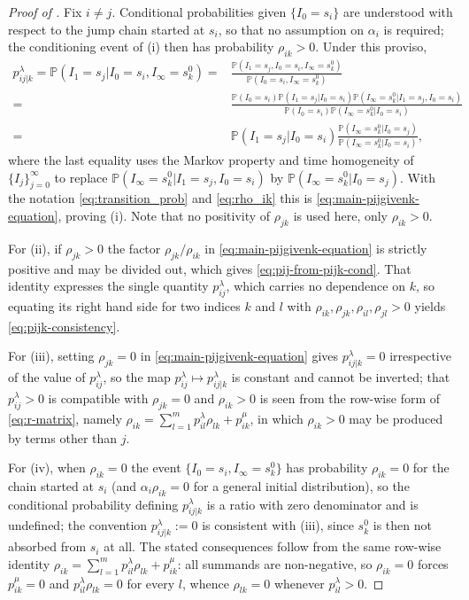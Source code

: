 \documentclass{article}
\begin{document}
\begin{proof}[Proof of ]
Fix $i \neq j$. Conditional probabilities given $\{I_0 = s_i\}$ are understood with respect to the
jump chain started at $s_i$, so that no assumption on $\alpha_i$ is required; the conditioning event
of \textup{(i)} then has probability $\rho_{ik} > 0$. Under this proviso,
\begin{align*}
p^\lambda_{ij|k}=\mathbb{P}(I_{1}=s_j\vert I_0=s_i, I_{\infty}=s_k^0) =&\frac{\mathbb{P}(I_{1}=s_j, I_0=s_i, I_{\infty}=s^0_k)}{\mathbb{P}(I_0=s_i, I_{\infty}=s_k^0)}\\
=&\frac{\mathbb{P}(I_0=s_i)\mathbb{P}(I_{1}=s_j\vert I_0=s_i)\mathbb{P}(I_{\infty}=s_k^0\vert I_{1}=s_j,I_0=s_i)}{\mathbb{P}(I_0=s_i)\mathbb{P}(I_{\infty}=s^0_k\vert I_0=s_i)}\\
=& \mathbb{P}(I_{1}=s_j\vert I_0=s_i) \frac{\mathbb{P}(I_{\infty}=s^0_k\vert I_{0}=s_j)}{\mathbb{P}(I_{\infty}=s^0_k\vert I_0=s_i)},
\end{align*}
where the last equality uses the Markov property and time homogeneity of $\{I_j\}_{j=0}^\infty$ to
replace $\mathbb{P}(I_{\infty}=s_k^0\vert I_{1}=s_j,I_0=s_i)$ by $\mathbb{P}(I_{\infty}=s_k^0\vert
I_{0}=s_j)$. With the notation \eqref{eq:transition_prob} and \eqref{eq:rho_ik} this is
\eqref{eq:main-pijgivenk-equation}, proving \textup{(i)}. Note that no positivity of $\rho_{jk}$ is
used here, only $\rho_{ik}>0$.

For \textup{(ii)}, if $\rho_{jk}>0$ the factor $\rho_{jk}/\rho_{ik}$ in
\eqref{eq:main-pijgivenk-equation} is strictly positive and may be divided out, which gives
\eqref{eq:pij-from-pijk-cond}. That identity expresses the single quantity $p^\lambda_{ij}$, which
carries no dependence on $k$, so equating its right hand side for two indices $k$ and $l$ with
$\rho_{ik},\rho_{jk},\rho_{il},\rho_{jl}>0$ yields \eqref{eq:pijk-consistency}.

For \textup{(iii)}, setting $\rho_{jk}=0$ in \eqref{eq:main-pijgivenk-equation} gives
$p^\lambda_{ij|k}=0$ irrespective of the value of $p^\lambda_{ij}$, so the map
$p^\lambda_{ij} \mapsto p^\lambda_{ij|k}$ is constant and cannot be inverted; that $p^\lambda_{ij}>0$
is compatible with $\rho_{jk}=0$ and $\rho_{ik}>0$ is seen from the row-wise form of
\eqref{eq:r-matrix}, namely $\rho_{ik} = \sum_{l=1}^m p^\lambda_{il}\rho_{lk} + p^\mu_{ik}$, in which
$\rho_{ik}>0$ may be produced by terms other than $j$.

For \textup{(iv)}, when $\rho_{ik}=0$ the event $\{I_0=s_i, I_\infty=s^0_k\}$ has probability
$\rho_{ik}=0$ for the chain started at $s_i$ (and $\alpha_i\rho_{ik}=0$ for a general initial
distribution), so the conditional probability defining $p^\lambda_{ij|k}$ is a ratio with zero
denominator and is undefined; the convention $p^\lambda_{ij|k}:=0$ is consistent with \textup{(iii)}, since $s^0_k$ is
then not absorbed from $s_i$ at all. The stated consequences follow from the same row-wise identity
$\rho_{ik} = \sum_{l=1}^m p^\lambda_{il}\rho_{lk} + p^\mu_{ik}$: all summands are non-negative, so
$\rho_{ik}=0$ forces $p^\mu_{ik}=0$ and $p^\lambda_{il}\rho_{lk}=0$ for every $l$, whence
$\rho_{lk}=0$ whenever $p^\lambda_{il}>0$.


\end{proof}
\end{document}
